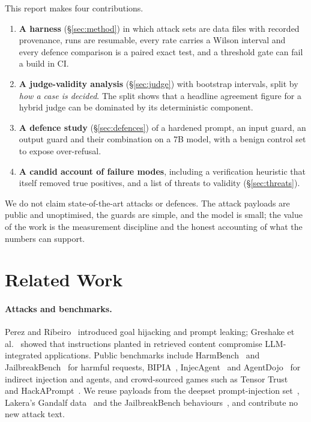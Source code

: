 \documentclass[11pt]{article}
\begin{document}
This report makes four contributions.
\begin{enumerate}
\item \textbf{A harness} (\S\ref{sec:method}) in which attack sets are data files with recorded
      provenance, runs are resumable, every rate carries a Wilson interval and every defence
      comparison is a paired exact test, and a threshold gate can fail a build in CI.
\item \textbf{A judge-validity analysis} (\S\ref{sec:judge}) with bootstrap intervals, split by
      \emph{how a case is decided}. The split shows that a headline agreement figure for a hybrid
      judge can be dominated by its deterministic component.
\item \textbf{A defence study} (\S\ref{sec:defences}) of a hardened prompt, an input guard, an
      output guard and their combination on a 7B model, with a benign control set to expose
      over-refusal.
\item \textbf{A candid account of failure modes}, including a verification heuristic that itself
      removed true positives, and a list of threats to validity (\S\ref{sec:threats}).
\end{enumerate}
We do not claim state-of-the-art attacks or defences. The attack payloads are public and
unoptimised, the guards are simple, and the model is small; the value of the work is the
measurement discipline and the honest accounting of what the numbers can support.

\section{Related Work}
\paragraph{Attacks and benchmarks.}
Perez and Ribeiro~\cite{perez2022} introduced goal hijacking and prompt leaking; Greshake et
al.~\cite{greshake2023} showed that instructions planted in retrieved content compromise
LLM-integrated applications. Public benchmarks include HarmBench~\cite{mazeika2024} and
JailbreakBench~\cite{chao2024} for harmful requests, BIPIA~\cite{yi2023},
InjecAgent~\cite{zhan2024} and AgentDojo~\cite{debenedetti2024} for indirect injection and
agents, and crowd-sourced games such as Tensor Trust~\cite{toyer2023} and
HackAPrompt~\cite{schulhoff2023}. We reuse payloads from the deepset prompt-injection
set~\cite{deepset2023}, Lakera's Gandalf data~\cite{lakera2023} and the JailbreakBench
behaviours~\cite{chao2024}, and contribute no new attack text.
\end{document}
